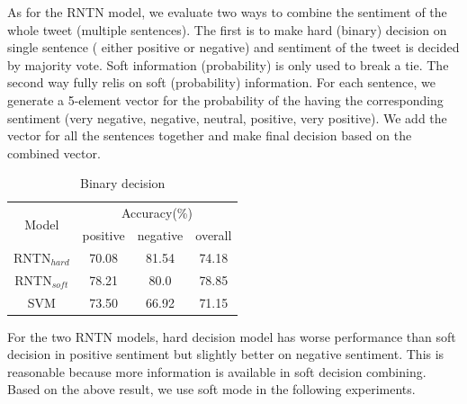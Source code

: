 As for the RNTN model, we evaluate two ways to combine the sentiment of the whole tweet (multiple sentences). The first is to make hard (binary) decision on single sentence ( either positive or negative) and sentiment of the tweet is decided by majority vote. Soft information (probability) is only used to break a tie. The second way fully relis on soft (probability) information. For each sentence, we generate a 5-element vector for the probability of the having the corresponding sentiment (very negative, negative, neutral, positive, very positive). We add the vector for all the sentences together and make final decision based on the combined vector. 
\begin{table}[H]
  \begin{center}
    \begin{tabular}{cccc}\hline
      \multirow{2}{*}{Model} 
      & \multicolumn{3}{c}{Accuracy(\%)} \\\cline{2-4}
    & positive & negative & overall \\ \hline
    RNTN$_{hard}$  & 70.08 	    &  81.54       &  74.18     \\
    RNTN$_{soft}$  & 78.21     &   80.0	    &   78.85    \\ 
    SVM           & 73.50     &   66.92     &   71.15      \\\hline 
    \end{tabular}
    \end{center}
    \caption{\label{exp2_1} Binary decision}
\end{table}

For the two RNTN models, hard decision model has worse performance than soft decision in positive sentiment but slightly better on negative sentiment. This is reasonable because more information is available in soft decision combining. Based on the above result, we use soft mode in the following experiments. 

